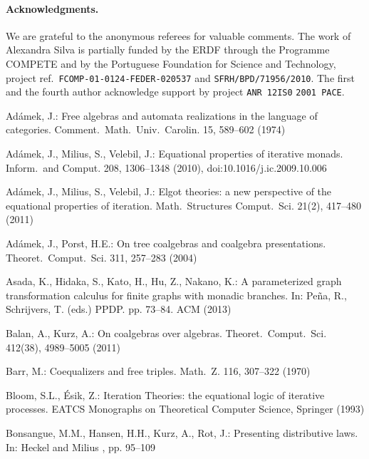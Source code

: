 \documentclass[oribibl,envcountsame,envcountsect,runningheads]{llncs}
\renewcommand{\>}{\rangle}
\begin{document}
\paragraph{Acknowledgments.}
We are grateful to the anonymous referees for valuable comments.
The work of Alexandra Silva is partially funded by the ERDF through the
Programme COMPETE and by the Portuguese Foundation for Science and
Technology, project ref.~\texttt{FCOMP-01-0124-FEDER-020537} and
\texttt{SFRH/BPD/}\texttt{71956/2010}.
The first and the fourth author acknowledge support by project \texttt{ANR 12IS0} \texttt{2001 PACE}.


\begin{thebibliography}{10}
\providecommand{\url}[1]{\texttt{#1}}
\providecommand{\urlprefix}{URL }

Ad\'{a}mek, J.: Free algebras and automata realizations in the language of
  categories. Comment.~Math.~Univ.~Carolin.  15,  589--602 (1974)

Ad\'amek, J., Milius, S., Velebil, J.: Equational properties of iterative
  monads. Inform.~and Comput.  208,  1306--1348 (2010),
  doi:10.1016/j.ic.2009.10.006

Ad\'amek, J., Milius, S., Velebil, J.: Elgot theories: a new perspective of the
  equational properties of iteration. Math.~Structures Comput.~Sci.  21(2),
  417--480 (2011)

Ad\'amek, J., Porst, H.E.: On tree coalgebras and coalgebra presentations.
  Theoret.~Comput.~Sci.  311,  257--283 (2004)

Asada, K., Hidaka, S., Kato, H., Hu, Z., Nakano, K.: A parameterized graph
  transformation calculus for finite graphs with monadic branches. In:
  Pe{\~n}a, R., Schrijvers, T. (eds.) PPDP. pp. 73--84. ACM (2013)

Balan, A., Kurz, A.: On coalgebras over algebras. Theoret.~Comput.~Sci. 412(38),
   4989--5005 (2011)

Barr, M.: Coequalizers and free triples. Math.~Z.  116,  307--322 (1970)

Bloom, S.L., \'Esik, Z.: Iteration Theories: the equational logic of iterative
  processes. EATCS Monographs on Theoretical Computer Science, Springer (1993)

Bonsangue, M.M., Hansen, H.H., Kurz, A., Rot, J.: Presenting distributive laws.
  In: Heckel and Milius  \cite{DBLP:conf/calco/2013}, pp. 95--109


\end{thebibliography}
\end{document}
